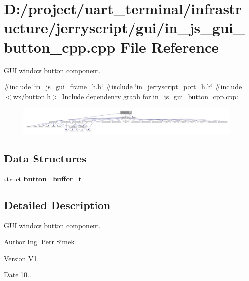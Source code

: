 \section{D\+:/project/uart\+\_\+terminal/infrastructure/jerryscript/gui/in\+\_\+js\+\_\+gui\+\_\+button\+\_\+cpp.cpp File Reference}
\label{in__js__gui__button__cpp_8cpp}


G\+UI window button component.  


{\ttfamily \#include \char`\"{}in\+\_\+js\+\_\+gui\+\_\+frame\+\_\+h.\+h\char`\"{}}\newline
{\ttfamily \#include \char`\"{}in\+\_\+jerryscript\+\_\+port\+\_\+h.\+h\char`\"{}}\newline
{\ttfamily \#include $<$wx/button.\+h$>$}\newline
Include dependency graph for in\+\_\+js\+\_\+gui\+\_\+button\+\_\+cpp.\+cpp\+:
\nopagebreak
\begin{figure}[H]
\begin{center}
\leavevmode
\includegraphics[width=350pt]{in__js__gui__button__cpp_8cpp__incl}
\end{center}
\end{figure}
\subsection*{Data Structures}
\begin{DoxyCompactItemize}
\item 
struct \textbf{ button\+\_\+buffer\+\_\+t}
\end{DoxyCompactItemize}


\subsection{Detailed Description}
G\+UI window button component. 

\begin{DoxyAuthor}{Author}
Ing. Petr Simek 
\end{DoxyAuthor}
\begin{DoxyVersion}{Version}
V1. 
\end{DoxyVersion}
\begin{DoxyDate}{Date}
10.. 
\end{DoxyDate}
